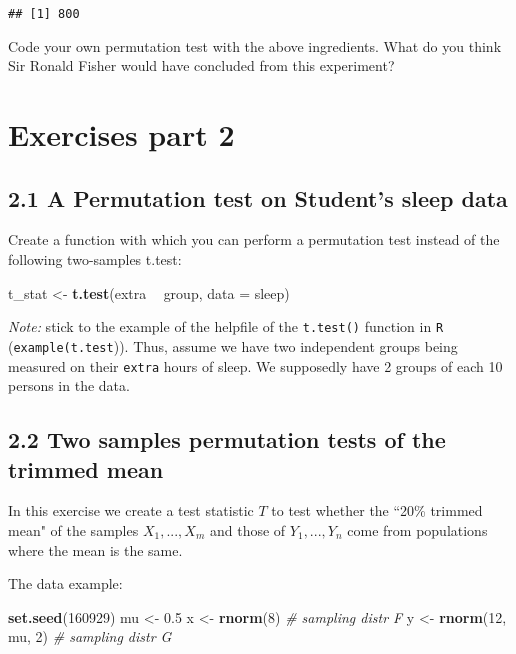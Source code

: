 \documentclass[]{article}
\newenvironment{Shaded}{\begin{snugshade}}{\end{snugshade}}
\newcommand{\CommentTok}[1]{\textcolor[rgb]{0.56,0.35,0.01}{\textit{#1}}}
\newcommand{\DataTypeTok}[1]{\textcolor[rgb]{0.13,0.29,0.53}{#1}}
\newcommand{\DecValTok}[1]{\textcolor[rgb]{0.00,0.00,0.81}{#1}}
\newcommand{\FloatTok}[1]{\textcolor[rgb]{0.00,0.00,0.81}{#1}}
\newcommand{\KeywordTok}[1]{\textcolor[rgb]{0.13,0.29,0.53}{\textbf{#1}}}
\newcommand{\NormalTok}[1]{#1}
\newcommand{\OperatorTok}[1]{\textcolor[rgb]{0.81,0.36,0.00}{\textbf{#1}}}
\newcommand{\StringTok}[1]{\textcolor[rgb]{0.31,0.60,0.02}{#1}}
\begin{document}
\begin{verbatim}
## [1] 800
\end{verbatim}

Code your own permutation test with the above ingredients. What do you
think Sir Ronald Fisher would have concluded from this experiment?

\hypertarget{exercises-part-2}{%
\section{Exercises part 2}\label{exercises-part-2}}

\hypertarget{a-permutation-test-on-students-sleep-data}{%
\subsection{2.1 A Permutation test on Student's sleep
data}\label{a-permutation-test-on-students-sleep-data}}

Create a function with which you can perform a permutation test instead
of the following two-samples t.test:

\begin{Shaded}
\begin{Highlighting}[]
\NormalTok{t_stat <-}\StringTok{ }\KeywordTok{t.test}\NormalTok{(extra }\OperatorTok{~}\StringTok{ }\NormalTok{group, }\DataTypeTok{data =}\NormalTok{ sleep)}
\end{Highlighting}
\end{Shaded}

\emph{Note:} stick to the example of the helpfile of the
\texttt{t.test()} function in \texttt{R} (\texttt{example(t.test})).
Thus, assume we have two independent groups being measured on their
\texttt{extra} hours of sleep. We supposedly have 2 groups of each 10
persons in the data.

\hypertarget{two-samples-permutation-tests-of-the-trimmed-mean}{%
\subsection{2.2 Two samples permutation tests of the trimmed
mean}\label{two-samples-permutation-tests-of-the-trimmed-mean}}

In this exercise we create a test statistic \(T\) to test whether the
``20\% trimmed mean" of the samples \(X_1,...,X_m\) and those of
\(Y_1,...,Y_n\) come from populations where the mean is the same.

The data example:

\begin{Shaded}
\begin{Highlighting}[]
\KeywordTok{set.seed}\NormalTok{(}\DecValTok{160929}\NormalTok{)}
\NormalTok{mu <-}\StringTok{ }\FloatTok{0.5}
\NormalTok{x <-}\StringTok{ }\KeywordTok{rnorm}\NormalTok{(}\DecValTok{8}\NormalTok{) }\CommentTok{# sampling distr F}
\NormalTok{y <-}\StringTok{ }\KeywordTok{rnorm}\NormalTok{(}\DecValTok{12}\NormalTok{, mu, }\DecValTok{2}\NormalTok{) }\CommentTok{# sampling distr G}
\end{Highlighting}
\end{Shaded}
\end{document}
